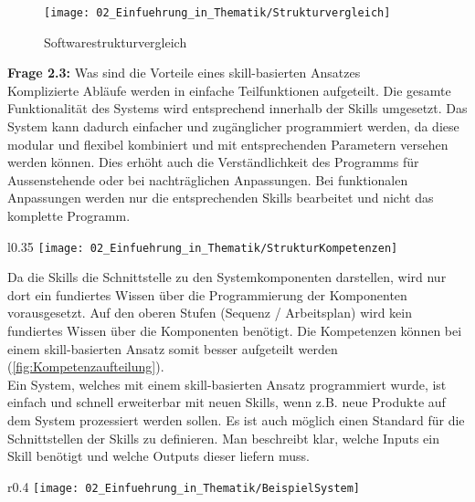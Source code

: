 		\begin{figure}[h!]
			\centering
			\texttt{[image: 02\_Einfuehrung\_in\_Thematik/Strukturvergleich]}
			\captionsetup{justification=centering}
			\caption{Softwarestrukturvergleich}
			\label{fig:Softwarestrukturvergleich}
		\end{figure}
	
	\vspace{3mm}
	
	\textbf{Frage 2.3:} Was sind die Vorteile eines skill-basierten Ansatzes \vspace{2mm} 
	\\
		Komplizierte Abläufe werden in einfache Teilfunktionen aufgeteilt. Die gesamte Funktionalität des Systems wird entsprechend innerhalb der Skills umgesetzt. Das System kann dadurch einfacher und zugänglicher programmiert werden, da diese modular und flexibel kombiniert und mit entsprechenden Parametern versehen werden können. Dies erhöht auch die Verständlichkeit des Programms für Aussenstehende oder bei nachträglichen Anpassungen. 
		Bei funktionalen Anpassungen werden nur die entsprechenden Skills bearbeitet und nicht das komplette Programm.
		\\
		\begin{wrapfigure}{l}{0.35\textwidth}
			\centering
			\texttt{[image: 02\_Einfuehrung\_in\_Thematik/StrukturKompetenzen]}
			\captionsetup{justification=centering}
			\caption{Kompetenzaufteilung}
			\label{fig:Kompetenzaufteilung}
		\end{wrapfigure}
		Da die Skills die Schnittstelle zu den Systemkomponenten darstellen, wird nur dort ein fundiertes Wissen über die Programmierung der Komponenten vorausgesetzt. Auf den oberen Stufen (Sequenz / Arbeitsplan) wird kein fundiertes Wissen über die Komponenten benötigt. Die Kompetenzen können bei einem skill-basierten Ansatz somit besser aufgeteilt werden (\ref{fig:Kompetenzaufteilung}). 
		\\
		Ein System, welches mit einem skill-basierten Ansatz programmiert wurde, ist einfach und schnell erweiterbar mit neuen Skills, wenn z.B. neue Produkte auf dem System prozessiert werden sollen. Es ist auch möglich einen Standard für die Schnittstellen der Skills zu definieren. Man beschreibt klar, welche Inputs ein Skill benötigt und welche Outputs dieser liefern muss.
		\\
		\vspace{-7mm}
		\begin{wrapfigure}{r}{0.4\textwidth}
			\centering
			\texttt{[image: 02\_Einfuehrung\_in\_Thematik/BeispielSystem]}
			\captionsetup{justification=centering}
			\caption{Beispielszenario}
			\label{fig:Beispielszenario}
		\end{wrapfigure} \par
